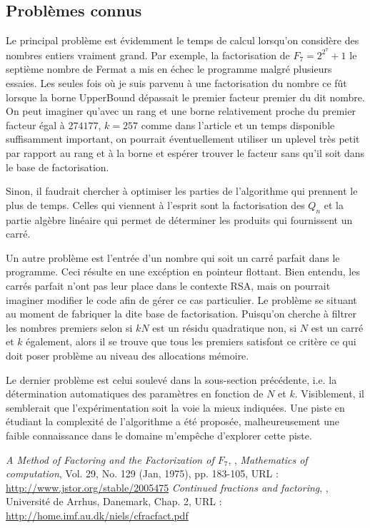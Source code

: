 \documentclass[a4paper]{article} %
\numberwithin{equation}{section}
\begin{document}
\subsection{Problèmes connus}
Le principal problème est évidemment le temps de calcul lorsqu'on considère des nombres entiers vraiment grand. Par exemple, la factorisation de $F_7 = 2^{2^7} + 1$ le septième nombre de Fermat a mis en échec le programme malgré plusieurs essaies. Les seules fois où je suis parvenu à une factorisation du nombre ce fût lorsque la borne UpperBound dépassait le premier facteur premier du dit nombre. On peut imaginer qu'avec un rang et une borne relativement proche du premier facteur égal à $274177$, $k = 257$ comme dans l'article et un temps disponible suffisamment important, on pourrait éventuellement utiliser un uplevel très petit par rapport au rang et à la borne et espérer trouver le facteur sans qu'il soit dans le base de factorisation.\par
Sinon, il faudrait chercher à optimiser les parties de l'algorithme qui prennent le plus de temps. Celles qui viennent à l'esprit sont la factorisation des $Q_n$ et la partie algèbre linéaire qui permet de déterminer les produits qui fournissent un carré.\\\par
Un autre problème est l'entrée d'un nombre qui soit un carré parfait dans le programme. Ceci résulte en une excéption en pointeur flottant. Bien entendu, les carrés parfait n'ont pas leur place dans le contexte RSA, mais on pourrait imaginer modifier le code afin de gérer ce cas particulier. Le problème se situant au moment de fabriquer la dite base de factorisation. Puisqu'on cherche à filtrer les nombres premiers selon si $kN$ est un résidu quadratique non, si $N$ est un carré et $k$ également, alors il se trouve que tous les premiers satisfont ce critère ce qui doit poser problème au niveau des allocations mémoire.\\\par
Le dernier problème est celui soulevé dans la sous-section précédente, i.e. la détermination automatiques des paramètres en fonction de $N$ et $k$. Visiblement, il semblerait que l'expérimentation soit la voie la mieux indiquées. Une piste en étudiant la complexité de l'algorithme a été proposée, malheureusement une faible connaissance dans le domaine m'empêche d'explorer cette piste.
\newpage
\clearpage
{}
\begin{thebibliography}{LC}
 \emph{A Method of Factoring and the Factorization of $F_7$}, , \textit{Mathematics of computation}, Vol. 29, No. 129 (Jan, 1975), pp. 183-105, URL : \url{http://www.jstor.org/stable/2005475}
 \emph{Continued fractions and factoring}, , Université de Arrhus, Danemark, Chap. 2, URL : \url{http://home.imf.au.dk/niels/cfracfact.pdf}
\end{thebibliography}
\end{document}
